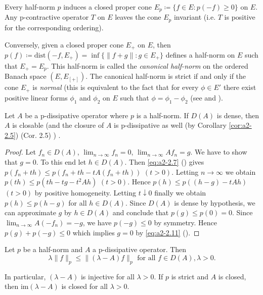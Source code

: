 \begin{remark}\label{rem:a2-2.8}
Every half-norm $p$ induces a closed proper cone 
$E_{p} \coloneqq \{f \in E \colon p(-f) \geq 0\}$ on $E$.
Any p-contractive operator $T$ on $E$ leaves the cone $E_{p}$ invariant (i.e. $T$ is positive for the corresponding ordering).

Conversely, given a closed proper cone $E_{+}$ on $E$, then 
$p(f) \coloneqq \text{dist}(-f,E_{+}) = \inf\{\|f + g\| \colon g \in E_{+}\}$ defines a half-norm on $E$ such that $E_{+} = E_{p}$.
This half-norm is called the \emph{canonical half-norm} on the ordered Banach space $(E,E_[+])$.
The canonical half-norm is strict if and only if the cone $E_{+}$ is \emph{normal} (this is equivalent to the fact that for every $\phi \in E'$ there exist positive linear forms $\phi_{1}$ and $\phi_{2}$ on $E$ such that $\phi = \phi_{1} - \phi_{2}$ (see \citet{battyrobinson:1984} and \citet[Chap. V]{schaefer:1966}).
\end{remark}
\begin{proposition}\label{prop:a2-2.9}
Let $A$ be a p-dissipative operator where $p$ is a half-norm.
If $D(A)$ is dense, then $A$ is closable (and the closure of $A$ is p-dissipative as well (by Corollary \ref{cor:a2-2.5}) (\lnm Cor. 2.5) ) .
\end{proposition}

\begin{proof}
Let $f_n \in D(A)$, $\lim_{n \to \infty} f_{n} = 0$, $\lim_{n \to \infty} Af_{n} = g$.
We have to show that $g = 0$.
To this end let $h \in D(A)$.
Then \eqref{eq:a2-2.7} () 
gives $p(f_{n} + th) \leq p(f_{n} + th - tA(f_{n} + th))$ $(t > 0)$.
Letting $n \to \infty$ we obtain 
$p(th) \leq p(th - tg - t^{2}Ah)$ \quad $(t > 0)$.
Hence $p(h) \leq p((h-g) - tAh)$ $(t > 0)$ by positive homogeneity.
Letting $t \downarrow 0$ finally we obtain $p(h) \leq p(h - g)$ for all $h \in D(A)$.
Since $D(A)$ is dense by hypothesis, we can approximate $g$ by $h \in D(A)$ and conclude that $p(g) \leq p(0) = 0$.
Since $\lim_{n\to\infty} A(-f_{n}) = -g$, we have $p(-g) \leq 0$ by symmetry.
Hence $p(g) + p(-g) \leq 0$ which implies $g = 0$ by \eqref{eq:a2-2.11} ().
\end{proof}

\begin{lemma}\label{lem:a2-2.10}
Let $p$ be a half-norm and $A$ a p-dissipative operator.
Then
\begin{equation}\label{eq:a2-2.14}
\lambda\|f\|_{p} \leq \|(\lambda - A)f\|_{p} \text{ for all } f \in D(A), \lambda > 0.
\end{equation}

In particular, $(\lambda-A)$ is injective for all $\lambda > 0$.
If $p$ is strict and $A$ is closed, then $\text{im}(\lambda - A)$ is closed for all $\lambda > 0$.
\end{lemma}

